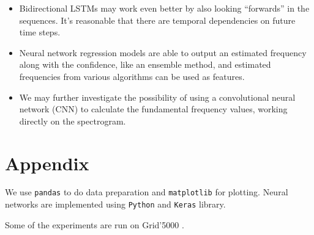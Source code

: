\documentclass[11pt,a4paper,titlepage]{article}
\begin{document}
\begin{itemize}
  \item Bidirectional LSTMs may work even better by also looking \enquote{forwards} in the sequences.
    It's reasonable that there are temporal dependencies on future time steps.
  \item Neural network regression models are able to output an estimated frequency along with the confidence, like an ensemble method, and estimated frequencies from various algorithms can be used as features.
  \item We may further investigate the possibility of using a convolutional neural network (CNN) to calculate the fundamental frequency values, working directly on the spectrogram.
\end{itemize}

\newpage

\appendix

\section{Appendix}

We use \texttt{pandas} \cite{mckinney2010data} to do data preparation and \texttt{matplotlib} \cite{hunter2007matplotlib} for plotting.
Neural networks are implemented using \texttt{Python} and \texttt{Keras} \cite{chollet2015keras} library.

Some of the experiments are run on Grid'5000 \cite{balouek2012adding}.

\newpage

\printbibliography
\end{document}

